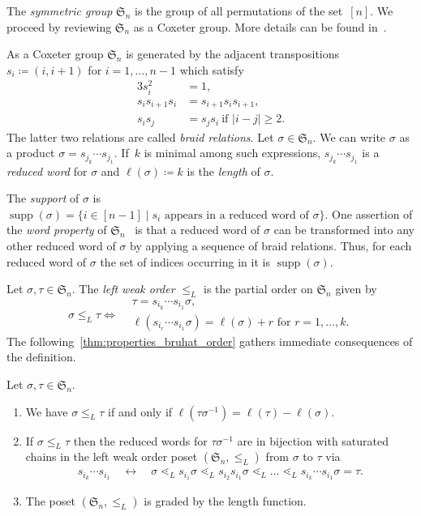\documentclass[ALCO,ThmDefs,Unicode,epreuves]{cedram}
\DeclareMathOperator{\supp}{supp}
\newcommand{\fS}{\mathfrak{S}}
\newcommand{\fs}{s}
\begin{document}
The \emph{symmetric group} $\fS_n$ is the group of all permutations of the set~$[n]$. We proceed by reviewing $\fS_n$ as a Coxeter group. More details can be found in~\cite{Bjorner2006}.

As a Coxeter group $\fS_n$ is generated by the adjacent transpositions $\fs_i \coloneqq (i,i+1)$ for $i= 1,\dots, n-1$ which satisfy
\begin{alignat*}{3}
\fs_i^2 &= 1, 			\\
\fs_i\fs_{i+1}\fs_i &= \fs_{i+1}\fs_i\fs_{i+1}, 	\\
\fs_i\fs_j &= \fs_j \fs_i 		\ \text{if } |i-j|\geq 2. 
\end{alignat*}
The latter two relations are called \emph{braid relations}.
Let $\sigma \in \fS_n$. We can write $\sigma$ as a product $\sigma = s_{j_k} \cdots s_{j_1}$.
If~$k$ is minimal among such expressions, $s_{j_k} \cdots s_{j_1}$ is a \emph{reduced word} for $\sigma$ and $\ell(\sigma) \coloneqq k$ is the \emph{length} of $\sigma$. 

The \emph{support} of $\sigma$ is $\supp(\sigma) =\{ i\in [n-1] \mid \text{$\fs_i$ appears in a reduced word of $\sigma$}\}$.
One assertion of the \emph{word property} of $\fS_n$~\cite[Theorem~3.3.1]{Bjorner2006} is that a reduced word of $\sigma$ can be transformed into any other reduced word of $\sigma$ by applying a sequence of braid relations. 
Thus, for each reduced word of $\sigma$ the set of indices occurring in it is $\supp(\sigma)$.

Let $\sigma,\tau \in \fS_n$. The \emph{left weak order} $\leq_L$ is the partial order on $\fS_n$ given by
\begin{equation*}
\sigma \leq_L \tau \iff 
\begin{aligned}
&\tau = \fs_{i_k} \cdots \fs_{i_1} \sigma, \\
&\ell(\fs_{i_r} \cdots \fs_{i_1} \sigma) = \ell(\sigma) + r \text{ for } r=1,\dots ,k.
\end{aligned}
\end{equation*}
The following~\cref{thm:properties_bruhat_order} gathers immediate consequences of the definition.

\begin{prop} 
		\label{thm:properties_bruhat_order}
	Let $\sigma,\tau \in \fS_n$.
	\begin{enumerate}
		\item We have $\sigma \leq_L \tau$ if and only if $\ell(\tau\sigma^{-1}) = \ell(\tau) - \ell(\sigma)$.
		\item If $\sigma\leq_L \tau$ then the reduced words for $\tau\sigma^{-1}$ are in bijection with saturated chains in the left weak order poset $(\fS_n, \leq_L)$ from $\sigma$ to $\tau$ via 
		\begin{align*}
		\fs_{i_k} \cdots \fs_{i_1} \quad \longleftrightarrow \quad \sigma \lessdot_L \fs_{i_1} \sigma \lessdot_L \fs_{i_2}\fs_{i_1} \sigma \lessdot_L\dots \lessdot_L \fs_{i_k} \cdots \fs_{i_1}\sigma = \tau.
		\end{align*}
		\item The poset $(\fS_n, \leq_L)$ is graded by the length function.
	\end{enumerate}
\end{prop}
\end{document}
